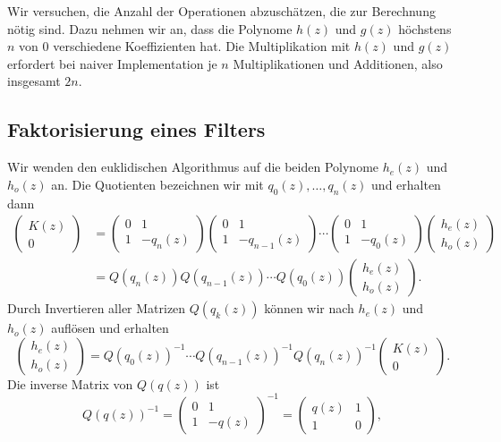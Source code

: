 Wir versuchen, die Anzahl der Operationen abzuschätzen, die zur
Berechnung nötig sind.
Dazu nehmen wir an, dass die Polynome $h(z)$ und $g(z)$ höchstens $n$
von $0$ verschiedene Koeffizienten hat.
Die Multiplikation mit $h(z)$ und $g(z)$ erfordert bei naiver 
Implementation je $n$ Multiplikationen und Additionen, also
insgesamt $2n$.

\subsection{Faktorisierung eines Filters}
Wir wenden den euklidischen Algorithmus auf die beiden Polynome $h_e(z)$
und $h_o(z)$ an.
Die Quotienten bezeichnen wir mit $q_0(z),\dots,q_n(z)$ und erhalten dann
\begin{align*}
\begin{pmatrix} K(z) \\ 0 \end{pmatrix}
&=
\begin{pmatrix} 0&1\\ 1&-q_n(z) \end{pmatrix}
\begin{pmatrix} 0&1\\ 1&-q_{n-1}(z) \end{pmatrix}
\cdots
\begin{pmatrix} 0&1\\ 1&-q_0(z) \end{pmatrix}
\begin{pmatrix} h_e(z)\\h_o(z)\end{pmatrix}
\\
&=
Q(q_n(z))
Q(q_{n-1}(z))
\cdots
Q(q_0(z))
\begin{pmatrix} h_e(z)\\h_o(z)\end{pmatrix}.
\end{align*}
Durch Invertieren aller Matrizen $Q(q_k(z))$ können wir nach $h_e(z)$
und $h_o(z)$ auflösen und erhalten
\[
\begin{pmatrix} h_e(z)\\h_o(z)\end{pmatrix}
=
Q(q_0(z))^{-1}
\cdots
Q(q_{n-1}(z))^{-1}
Q(q_n(z))^{-1}
\begin{pmatrix}K(z)\\0\end{pmatrix}.
\]
Die inverse Matrix von $Q(q(z))$ ist
\[
Q(q(z))^{-1}
= 
\begin{pmatrix}
0&1\\
1&-q(z)
\end{pmatrix}^{-1}
=
\begin{pmatrix}
q(z)&1\\
1&0
\end{pmatrix},
\]
